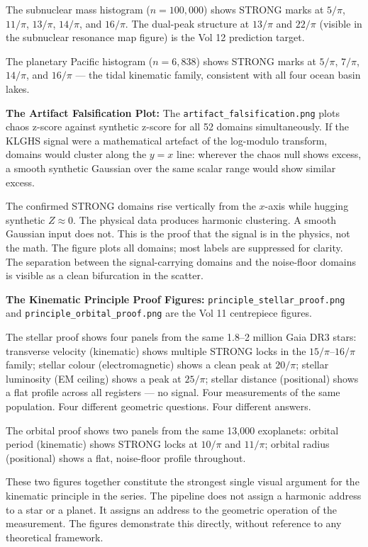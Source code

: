 \documentclass[11pt, letterpaper, openany]{book}
\begin{document}
\begin{empiricalbox}
The subnuclear mass histogram ($n=100{,}000$) shows STRONG marks at
$5/\pi$, $11/\pi$, $13/\pi$, $14/\pi$, and $16/\pi$. The dual-peak
structure at $13/\pi$ and $22/\pi$ (visible in the subnuclear resonance
map figure) is the Vol 12 prediction target.

The planetary Pacific histogram ($n=6{,}838$) shows STRONG marks at
$5/\pi$, $7/\pi$, $14/\pi$, and $16/\pi$ --- the tidal kinematic family,
consistent with all four ocean basin lakes.

\textbf{The Artifact Falsification Plot:}
The \texttt{artifact\_falsification.png} plots chaos z-score against synthetic
z-score for all 52 domains simultaneously. If the KLGHS signal were a
mathematical artefact of the log-modulo transform, domains would cluster
along the $y=x$ line: wherever the chaos null shows excess, a smooth
synthetic Gaussian over the same scalar range would show similar excess.

The confirmed STRONG domains rise vertically from the $x$-axis while
hugging synthetic $Z \approx 0$. The physical data produces harmonic
clustering. A smooth Gaussian input does not. This is the proof that the
signal is in the physics, not the math. The figure plots all domains;
most labels are suppressed for clarity. The separation between the
signal-carrying domains and the noise-floor domains is visible as a
clean bifurcation in the scatter.

\textbf{The Kinematic Principle Proof Figures:}
\texttt{principle\_stellar\_proof.png} and
\texttt{principle\_orbital\_proof.png} are the Vol 11 centrepiece figures.

The stellar proof shows four panels from the same 1.8--2 million Gaia DR3
stars: transverse velocity (kinematic) shows multiple STRONG locks in the
$15/\pi$--$16/\pi$ family; stellar colour (electromagnetic) shows a clean
peak at $20/\pi$; stellar luminosity (EM ceiling) shows a peak at $25/\pi$;
stellar distance (positional) shows a flat profile across all registers ---
no signal. Four measurements of the same population. Four different geometric
questions. Four different answers.

The orbital proof shows two panels from the same 13,000 exoplanets: orbital
period (kinematic) shows STRONG locks at $10/\pi$ and $11/\pi$; orbital
radius (positional) shows a flat, noise-floor profile throughout.

These two figures together constitute the strongest single visual argument
for the kinematic principle in the series. The pipeline does not assign
a harmonic address to a star or a planet. It assigns an address to the
geometric operation of the measurement. The figures demonstrate this
directly, without reference to any theoretical framework.


\end{empiricalbox}
\end{document}

